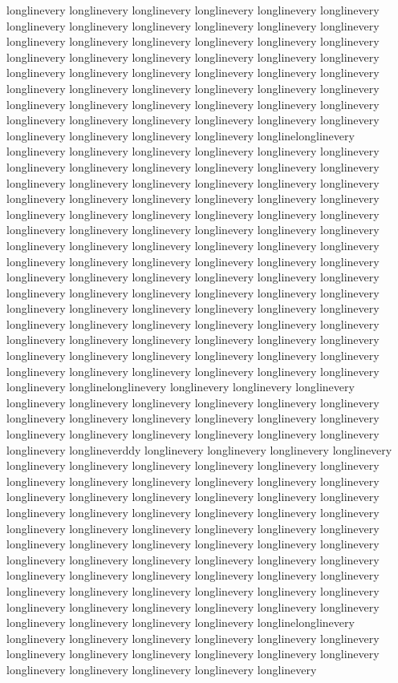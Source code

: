 {longlinevery longlinevery longlinevery longlinevery longlinevery longlinevery longlinevery longlinevery longlinevery longlinevery longlinevery longlinevery longlinevery longlinevery longlinevery longlinevery longlinevery longlinevery longlinevery longlinevery longlinevery longlinevery longlinevery longlinevery longlinevery longlinevery longlinevery longlinevery longlinevery longlinevery longlinevery longlinevery longlinevery longlinevery longlinevery longlinevery longlinevery longlinevery longlinevery longlinevery longlinevery longlinevery longlinevery longlinevery longlinevery longlinevery longlinevery longlinevery longlinevery longlinevery longlinevery longlinevery longlinelonglinevery longlinevery longlinevery longlinevery longlinevery longlinevery longlinevery longlinevery longlinevery longlinevery longlinevery longlinevery longlinevery longlinevery longlinevery longlinevery longlinevery longlinevery longlinevery longlinevery longlinevery longlinevery longlinevery longlinevery longlinevery longlinevery longlinevery longlinevery longlinevery longlinevery longlinevery longlinevery longlinevery longlinevery longlinevery longlinevery longlinevery longlinevery longlinevery longlinevery longlinevery longlinevery longlinevery longlinevery longlinevery longlinevery longlinevery longlinevery longlinevery longlinevery longlinevery longlinevery longlinevery longlinevery longlinevery longlinevery longlinevery longlinevery longlinevery longlinevery longlinevery longlinevery longlinevery longlinevery longlinevery longlinevery longlinevery longlinevery longlinevery longlinevery longlinevery longlinevery longlinevery longlinevery longlinevery longlinevery longlinevery longlinevery longlinevery longlinevery longlinevery longlinevery longlinevery longlinevery longlinevery longlinevery longlinevery longlinevery longlinevery longlinevery longlinevery longlinevery longlinelonglinevery longlinevery longlinevery longlinevery longlinevery longlinevery longlinevery longlinevery longlinevery longlinevery longlinevery longlinevery longlinevery longlinevery longlinevery longlinevery longlinevery longlinevery longlinevery longlinevery longlinevery longlinevery longlinevery longlineverddy longlinevery longlinevery longlinevery longlinevery longlinevery longlinevery longlinevery longlinevery longlinevery longlinevery longlinevery longlinevery longlinevery longlinevery longlinevery longlinevery longlinevery longlinevery longlinevery longlinevery longlinevery longlinevery longlinevery longlinevery longlinevery longlinevery longlinevery longlinevery longlinevery longlinevery longlinevery longlinevery longlinevery longlinevery longlinevery longlinevery longlinevery longlinevery longlinevery longlinevery longlinevery longlinevery longlinevery longlinevery longlinevery longlinevery longlinevery longlinevery longlinevery longlinevery longlinevery longlinevery longlinevery longlinevery longlinevery longlinevery longlinevery longlinevery longlinevery longlinevery longlinevery longlinevery longlinevery longlinevery longlinevery longlinevery longlinevery longlinevery longlinelonglinevery longlinevery longlinevery longlinevery longlinevery longlinevery longlinevery longlinevery longlinevery longlinevery longlinevery longlinevery longlinevery longlinevery longlinevery longlinevery longlinevery longlinevery }
